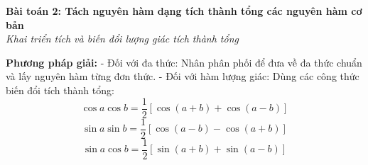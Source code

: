 \documentclass[12pt,a4paper]{article}
\newenvironment{lesson}[2]{
	\vspace{1em}\noindent\textbf{\Large #1}\\
	\textit{#2}\vspace{0.5em}
}{}
\begin{document}

\begin{lesson}{Bài toán 2: Tách nguyên hàm dạng tích thành tổng các nguyên hàm cơ bản}{Khai triển tích và biến đổi lượng giác tích thành tổng}

\textbf{Phương pháp giải:}
- Đối với đa thức: Nhân phân phối để đưa về đa thức chuẩn và lấy nguyên hàm từng đơn thức.
- Đối với hàm lượng giác: Dùng các công thức biến đổi tích thành tổng:
$$\cos a \cos b = \frac{1}{2}[\cos(a+b) + \cos(a-b)]$$
$$\sin a \sin b = \frac{1}{2}[\cos(a-b) - \cos(a+b)]$$
$$\sin a \cos b = \frac{1}{2}[\sin(a+b) + \sin(a-b)]$$

\end{lesson}
\end{document}
